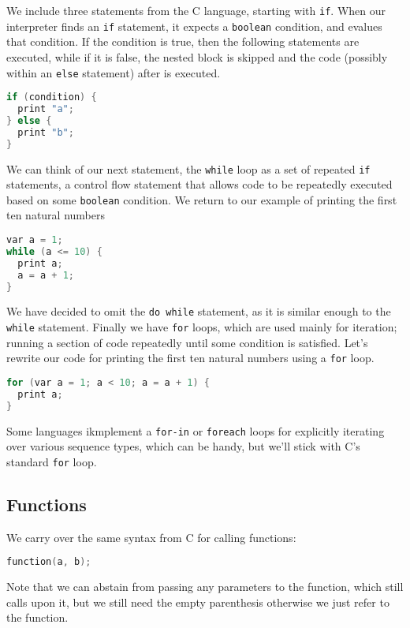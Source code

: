 We include three statements from the C language, starting with \verb+if+. When our interpreter finds an \verb+if+ statement, it expects a \verb+boolean+ condition, and evalues that condition. If the condition is true, then the following statements are executed, while if it is false, the nested block is skipped and the code (possibly within an \verb+else+ statement) after is executed.

\begin{lstlisting}[language=C]
if (condition) {
  print "a";
} else {
  print "b";
}
\end{lstlisting}

We can think of our next statement, the \verb+while+ loop as a set of repeated \verb+if+ statements, a control flow statement that allows code to be repeatedly executed based on some \verb+boolean+ condition. We return to our example of printing the first ten natural numbers

\begin{lstlisting}[language=C]
var a = 1;
while (a <= 10) {
  print a;
  a = a + 1;
}
\end{lstlisting}

We have decided to omit the \verb+do while+ statement, as it is similar enough to the \verb+while+ statement.
Finally we have \verb+for+ loops, which are used mainly for iteration; running a section of code repeatedly until some condition is satisfied. Let's rewrite our code for printing the first ten natural numbers using a \verb+for+ loop.

\begin{lstlisting}[language=C]
for (var a = 1; a < 10; a = a + 1) {
  print a;
}
\end{lstlisting}

Some languages ikmplement a \verb+for-in+ or \verb+foreach+ loops for explicitly iterating over various sequence types, which can be handy, but we'll stick with C's standard \verb+for+ loop. 

\subsection{Functions}

We carry over the same syntax from C for calling functions: 

\begin{lstlisting}[language=C]
function(a, b);
\end{lstlisting}

Note that we can abstain from passing any parameters to the function, which still calls upon it, but we still need the empty parenthesis otherwise we just refer to the function. 

